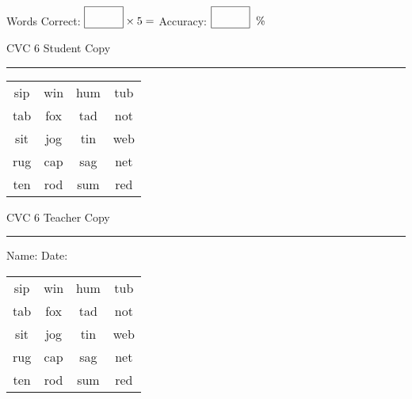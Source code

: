 \documentclass{memoir}
\begin{document}
\small

Words Correct: $\fbox{\phantom{\huge 100}} \times 5 = $ Accuracy: $\fbox{\phantom{\huge 100}}\;\; \%$ 

\vfill

\newpage


\footnotesize \noindent
CVC 6 \hfill Student Copy
\smallskip
\hrule

\Large

\setlength{\tabcolsep}{14pt}
\def\arraystretch{2}

{\selectfont


\begin{vplace}[0.5]
\begin{center}
\begin{tabular}{cccc}
sip & win & hum & tub \\
tab & fox & tad & not \\
sit & jog & tin & web \\
rug & cap & sag & net \\
ten & rod & sum & red \\
\end{tabular}
\end{center}
\end{vplace}

}

\newpage

\footnotesize \noindent
CVC 6 \hfill Teacher Copy
\smallskip
\hrule

\small

\vfill

\noindent
Name: \underline{\hspace{1.75in}} \hfill Date: \underline{\hspace{1in}}

\Large

{\selectfont


\begin{vplace}[0.5]
\begin{center}
\begin{tabular}{cccc}
sip & win & hum & tub \\
tab & fox & tad & not \\
sit & jog & tin & web \\
rug & cap & sag & net \\
ten & rod & sum & red \\
\end{tabular}
\end{center}
\end{vplace}



}
\end{document}
